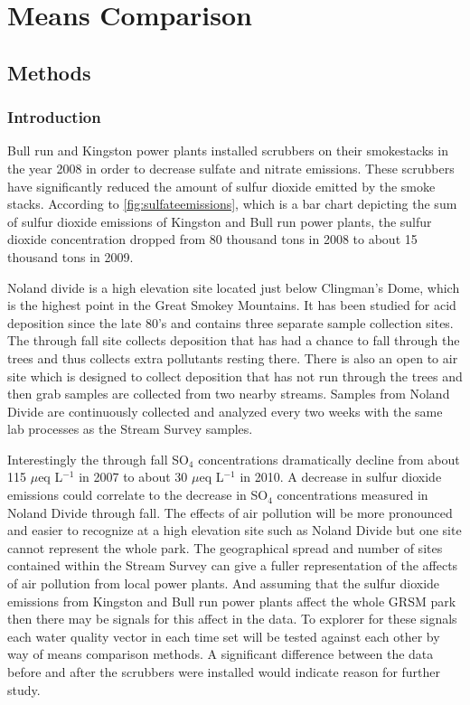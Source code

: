 \chapter{Means Comparison}\label{ch:mc}
\section{Methods}
\subsection{Introduction}

Bull run and Kingston power plants installed scrubbers on their smokestacks in the year 2008 in order to decrease sulfate and nitrate emissions.
These scrubbers have significantly reduced the amount of sulfur dioxide emitted by the smoke stacks.
According to \autoref{fig:sulfateemissions}, which is a bar chart depicting the sum of sulfur dioxide emissions of Kingston and Bull run power plants,  the sulfur dioxide concentration dropped from 80 thousand tons in 2008 to about 15 thousand tons in 2009.

Noland divide is a high elevation site located just below Clingman's Dome, which is the highest point in the Great Smokey Mountains.  
It has been studied for acid deposition since the late 80's and contains three separate sample collection sites.
The through fall site collects deposition that has had a chance to fall through the trees and thus collects extra pollutants resting there.
There is also an open to air site which is designed to collect deposition that has not run through the trees and then grab samples are collected from two nearby streams.
Samples from Noland Divide are continuously collected and analyzed every two weeks with the same lab processes as the Stream Survey samples.

Interestingly the through fall SO$_4$ concentrations dramatically decline from about 115 $\mu$eq L$^{-1}$ in 2007 to about 30 $\mu$eq L$^{-1}$ in 2010.
A decrease in sulfur dioxide emissions could correlate to the decrease in SO$_4$ concentrations measured in Noland Divide through fall.
The effects of air pollution will be more pronounced and easier to recognize at a high elevation site such as Noland Divide but one site cannot represent the whole park.
The geographical spread and number of sites contained within the Stream Survey can give a fuller representation of the affects of air pollution from local power plants.
And assuming that the sulfur dioxide emissions from Kingston and Bull run power plants affect the whole GRSM park then there may be signals for this affect in the data.
To explorer for these signals each water quality vector in each time set will be tested against each other by way of means comparison methods.
A significant difference between the data before and after the scrubbers were installed would indicate reason for further study.

